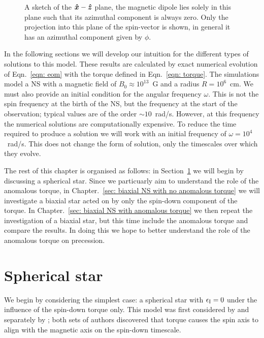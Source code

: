 \documentclass[../full_thesis/full_thesis.tex]{subfiles}
\newcommand{\thisdir}{../rotating_frame}
\begin{document}
\begin{figure}[ht]
\centering

\caption{A sketch of the  $\boldsymbol{\hat{x}}-\boldsymbol{\hat{z}}$ plane,  the magnetic dipole lies solely in
this plane such that its azimuthal component is always zero.  Only the
projection into this plane of the spin-vector is shown, in general it has an
azimuthal component given by $\phi$.}
	\label{fig: sketch01}
\end{figure}

In the following sections we will develop our intuition for the different types
of solutions to this model. These results are calculated by
exact numerical evolution of Eqn.~\eqref{eqn: eom} with the torque defined in
Eqn.~\eqref{eqn: torque}. The simulations model a NS with a magnetic field of
$B_{0}\approx10^{13}$~G and a radius $R=10^{6}$~cm. We must also provide an
initial condition for the angular frequency $\omega$. This is not the spin
frequency at the birth of the NS, but the frequency at the start of the observation;
typical values are of the order $\sim 10$~rad/s. However, at this frequency the
numerical solutions are computationally expensive. To reduce the time required
to produce a solution we will work with an initial frequency of $\omega =
10^{4}$~rad/s. This does not change the form of solution, only the timescales
over which they evolve.

The rest of this chapter is organised as follows: in Section~\ref{sec: spherical}
we will begin by discussing a spherical star. Since we particuarly aim to
understand the role of the anomalous torque, in Chapter.~\ref{sec: biaxial NS
with no anomalous torque} we will investigate a biaxial star acted on by only
the spin-down component of the torque. In Chapter.~\ref{sec: biaxial NS with
anomalous torque} we then repeat the investigation of a biaxial star, but this
time include the anomalous torque and compare the results. In doing this we
hope to better understand the role of the anomalous torque on precession.

\FloatBarrier
\section{Spherical star}
\label{sec: spherical}

We begin by considering the simplest case: a spherical star with $\epsilon_{\mathrm{I}}=0$
under the influence of the spin-down torque only. This model was first considered
by \citet{Davis1970} and separately by \citet{Michel1970}; both sets of authors
discovered that torque causes the spin axis to align with the magnetic axis on
the spin-down timescale.
\end{document}
